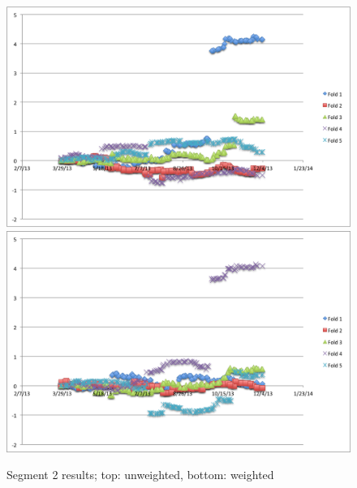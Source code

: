 \documentclass[11pt,letterpaper]{article}
\begin{document}
\begin{figure}
	\centering
	\centering
   	\includegraphics[width=14cm]{images/unweighted-exp-1.png}
    	\qquad
    	\includegraphics[width=14cm]{images/weighted-exp-1.png}
    	\caption{Segment 2 results; top: unweighted, bottom: weighted}%
    	\label{fig:2}
\end{figure}
\end{document}
